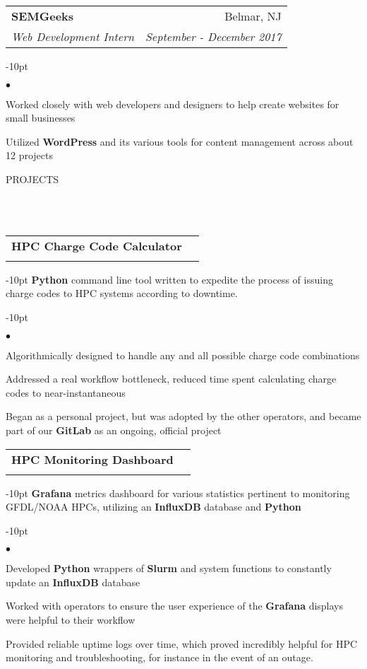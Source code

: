\documentclass[12pt]{article}
\makeatletter
\newcommand{\header}[1]{
	\vspace*{12pt} %
	{\hspace*{-14pt}\vspace*{6pt} #1}
	\vspace*{-6pt} 
	\lineunder
}
\newcommand{\lineunder}{
	\vspace*{-8pt} \\ 
	\hspace*{-18pt} 
	\hrulefill \\
}
\newcommand{\subheading}[4]{
 	\vspace{5pt}
    	\begin{tabular*}{1.01\textwidth}
    		{l@{\extracolsep{\fill}}r}
      		\hspace{-16pt}\textbf{#1} & #2 \\
      		\hspace{-16pt}\textit{\small#3} & \textit{\small #4} \\
    	\end{tabular*}
    \vspace{-4pt}
}
\newenvironment{achievements}{
\begin{adjustwidth}{-10pt}{}
  \begin{list}{$\bullet$}{
  	\topsep 0pt \itemsep -4pt}}
  	{\vspace*{2pt}\end{list}
\end{adjustwidth}
}
\makeatother
\begin{document}
\subheading
	{SEMGeeks}{Belmar, NJ}
	{Web Development Intern}{September - December 2017}
	\begin{achievements}
		\item Worked closely with web developers and designers to help create websites for small businesses
		\item Utilized \textbf{WordPress} and its various tools for content management across about 12 projects
	\end{achievements}


\vspace{-8pt}
\header{PROJECTS}

	
\subheading{HPC Charge Code Calculator}{}{}{}
	\vspace{-15pt}
	\begin{adjustwidth}{-10pt}{}
	\textbf{Python} command line tool written to expedite the process of issuing charge codes to HPC systems according to downtime.
	\end{adjustwidth}
	\begin{achievements}
		\item Algorithmically designed to handle any and all possible charge code combinations
		\item Addressed a real workflow bottleneck, reduced time spent calculating charge codes to near-instantaneous
		\item Began as a personal project, but was adopted by the other operators, and became part of our \textbf{GitLab} as an ongoing, official project
	\end{achievements}

\subheading{HPC Monitoring Dashboard}{}{}{}
	\vspace{-15pt}
	\begin{adjustwidth}{-10pt}{}
	\textbf{Grafana} metrics dashboard for various statistics pertinent to monitoring GFDL/NOAA HPCs, utilizing an \textbf{InfluxDB} database and \textbf{Python}
	\end{adjustwidth}
	\begin{achievements}
		\item Developed \textbf{Python} wrappers of \textbf{Slurm} and system functions to constantly update an \textbf{InfluxDB} database
		\item Worked with operators to ensure the user experience of the \textbf{Grafana} displays were helpful to their workflow
		\item Provided reliable uptime logs over time, which proved incredibly helpful for HPC monitoring and troubleshooting, for instance in the event of an outage.
	\end{achievements}
\end{document}
